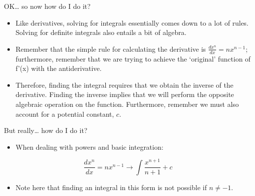 \documentclass[
  ignorenonframetext,
]{beamer}
\providecommand{\tightlist}{%
  \setlength{\itemsep}{0pt}\setlength{\parskip}{0pt}}
\begin{document}
\begin{frame}{OK\ldots{} so now how do I do it?}
\protect\hypertarget{ok-so-now-how-do-i-do-it}{}
\begin{itemize}[<+->]
\tightlist
\item
  Like derivatives, solving for integrals essentially comes down to a
  lot of rules. Solving for definite integrals also entails a bit of
  algebra.
\end{itemize}

\begin{itemize}[<+->]
\tightlist
\item
  Remember that the simple rule for calculating the derivative is
  \(\frac{dx^n}{dx} = nx^{n-1}\); furthermore, remember that we are
  trying to achieve the `original' function of f'(x) with the
  antiderivative.
\end{itemize}

\begin{itemize}[<+->]
\tightlist
\item
  Therefore, finding the integral requires that we obtain the inverse of
  the derivative. Finding the inverse implies that we will perform the
  opposite algebraic operation on the function. Furthermore, remember we
  must also account for a potential constant, \(c\).
\end{itemize}
\end{frame}

\begin{frame}{But really\ldots{} how do I do it?}
\protect\hypertarget{but-really-how-do-i-do-it}{}
\begin{itemize}[<+->]
\tightlist
\item
  When dealing with powers and basic integration:
\end{itemize}

\[ \frac{dx^n}{dx} = nx^{n-1} \rightarrow \int \frac{x^{n+1}}{n+1} + c\]

\begin{itemize}[<+->]
\tightlist
\item
  Note here that finding an integral in this form is not possible if
  \(n \neq -1\).
\end{itemize}
\end{frame}
\end{document}
